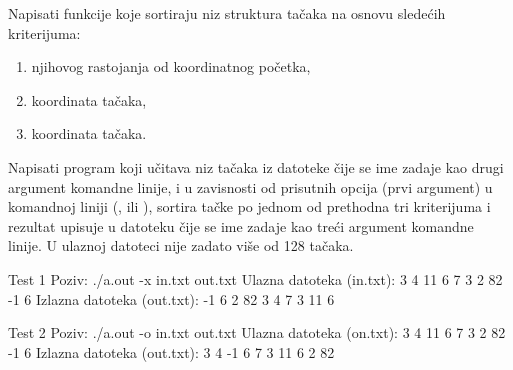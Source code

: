 \begin{Answer}[ref=507]
\end{Answer}
\begin{Exercise}[label=508]
  Napisati funkcije koje sortiraju niz struktura tačaka na
  osnovu sledećih kriterijuma:
  \begin{enumerate}
  \item njihovog rastojanja od koordinatnog početka,
  \item {} koordinata tačaka,
  \item {} koordinata tačaka.
  \end{enumerate}
  Napisati program koji učitava niz tačaka iz datoteke čije se ime
  zadaje kao drugi argument komandne linije, i u zavisnosti od
  prisutnih opcija (prvi argument) u komandnoj liniji (,
   ili ), sortira tačke po jednom od prethodna tri
  kriterijuma i rezultat upisuje u datoteku čije se ime zadaje kao
  treći argument komandne linije. U ulaznoj datoteci nije zadato više
  od 128 tačaka.
  
\begin{miditest}
\begin{test}{Test 1}
Poziv:  ./a.out -x in.txt out.txt
Ulazna datoteka (in.txt):
  3 4
  11 6
  7 3
  2 82
  -1 6
Izlazna datoteka (out.txt):
  -1 6
  2 82
  3 4
  7 3
  11 6
\end{test}
\end{miditest}
\begin{miditest}
\begin{test}{Test 2}
Poziv:  ./a.out -o in.txt out.txt
Ulazna datoteka (on.txt):
  3 4
  11 6
  7 3
  2 82
  -1 6
Izlazna datoteka (out.txt):
  3 4
  -1 6
  7 3
  11 6
  2 82
\end{test}
\end{miditest}
  
\end{Exercise}

